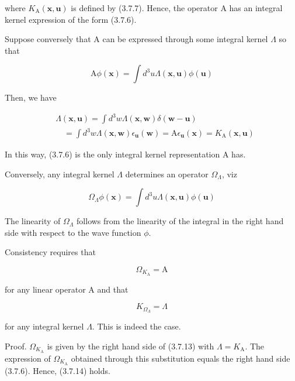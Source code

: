 \documentclass{article}
\begin{document}
where $K_{\mathrm{A}}(\boldsymbol{x}, \boldsymbol{u})$ is defined by (3.7.7). Hence, the operator A has an integral kernel expression of the form (3.7.6).

Suppose conversely that A can be expressed through some integral kernel $\Lambda$ so that
 
\begin{equation*}
\mathrm{A} \phi(\boldsymbol{x})=\int d^{3} u \Lambda(\boldsymbol{x}, \boldsymbol{u}) \phi(\boldsymbol{u}) \tag{3.7.11}
\end{equation*}
 

Then, we have
 
\begin{align*}
& \Lambda(\boldsymbol{x}, \boldsymbol{u})=\int d^{3} w \Lambda(\boldsymbol{x}, \boldsymbol{w}) \delta(\boldsymbol{w}-\boldsymbol{u})  \tag{3.7.12}\\
& \quad=\int d^{3} w \Lambda(\boldsymbol{x}, \boldsymbol{w}) \epsilon_{\boldsymbol{u}}(\boldsymbol{w})=\mathrm{A} \epsilon_{\boldsymbol{u}}(\boldsymbol{x})=K_{\mathrm{A}}(\boldsymbol{x}, \boldsymbol{u})
\end{align*}
 

In this way, (3.7.6) is the only integral kernel representation A has.

Conversely, any integral kernel $\Lambda$ determines an operator $\Omega_{\Lambda}$, viz
 
\begin{equation*}
\Omega_{\Lambda} \phi(\boldsymbol{x})=\int d^{3} u \Lambda(\boldsymbol{x}, \boldsymbol{u}) \phi(\boldsymbol{u}) \tag{3.7.13}
\end{equation*}
 

The linearity of $\Omega_{\Lambda}$ follows from the linearity of the integral in the right hand side with respect to the wave function $\phi$.

Consistency requires that
 
\begin{equation*}
\Omega_{K_{\mathrm{A}}}=\mathrm{A} \tag{3.7.14}
\end{equation*}
 
for any linear operator A and that
 
\begin{equation*}
K_{\Omega_{\Lambda}}=\Lambda \tag{3.7.15}
\end{equation*}
 
for any integral kernel $\Lambda$. This is indeed the case.

Proof. $\Omega_{K_{\mathrm{A}}}$ is given by the right hand side of (3.7.13) with $\Lambda=K_{\mathrm{A}}$. The expression of $\Omega_{K_{\mathrm{A}}}$ obtained through this substitution equals the right hand side (3.7.6). Hence, (3.7.14) holds.
\end{document}
